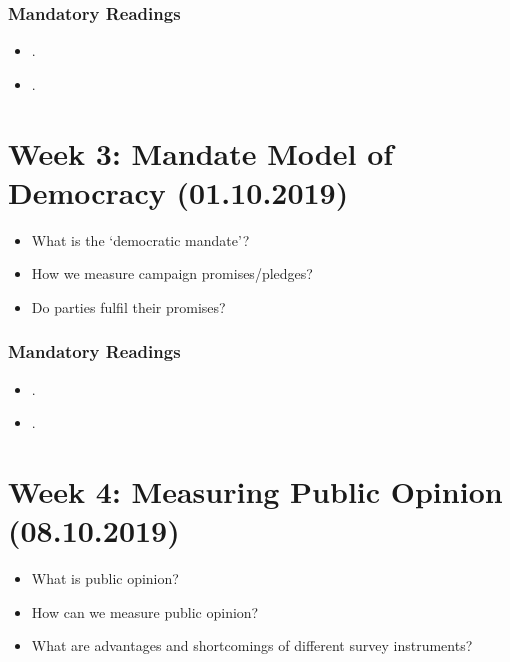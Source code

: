 \documentclass[abstract=on,parskip=full,headings=standardclasses,fontsize=11pt,paper=a4]{scrartcl}
\begin{document}
\subsubsection*{Mandatory Readings}
\begin{itemize}
\item {}.
\item {}.
\end{itemize}



\section{Week 3:  Mandate Model of Democracy (01.10.2019)}



\begin{itemize}
\renewcommand\labelitemi{--}
\item What is the `democratic mandate'? 
\item How we measure campaign promises/pledges?
\item Do parties fulfil their promises?
\end{itemize}

\subsubsection*{Mandatory Readings}
\begin{itemize}
\item {}.
\item {}.
\end{itemize}


\section{Week 4: Measuring Public Opinion (08.10.2019)}


\begin{itemize}
\renewcommand\labelitemi{--}
\item What is public opinion?
\item How can we measure public opinion? 
\item What are advantages and shortcomings of different survey instruments?
\end{itemize}
\end{document}
